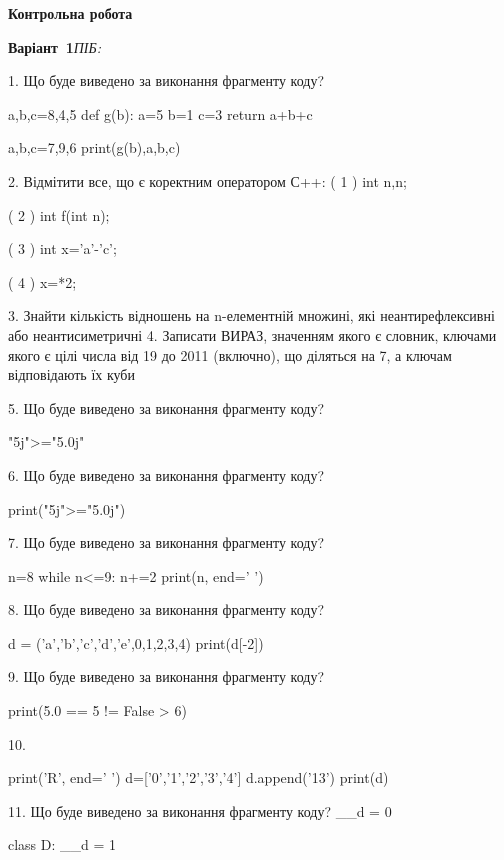 \documentclass[11pt]{article}
\begin{document}
{\large\textbf{Контрольна робота}}

\textbf{Варіант \No\,1}\hfill \textit{ПІБ:}\,\underline{\hspace{60mm}}
\vspace{4mm}

1. Що буде виведено за виконання фрагменту коду?

a,b,c=8,4,5
def g(b):
    a=5
    b=1
    c=3
    return a+b+c

a,b,c=7,9,6
print(g(b),a,b,c)

2. %
Відмітити все, що є коректним оператором С++:
( 1 ) int n,n;

( 2 ) int f(int n);

( 3 ) int x='a'-'c';

( 4 ) x=*2;

3. 
Знайти кількість відношень на n-елементній множині, які неантирефлексивні або неантисиметричні
4. 
Записати ВИРАЗ, значенням якого є словник, ключами якого є цілі числа від 19 до 2011 (включно), що діляться на 7, а ключам відповідають їх куби 

5. Що буде виведено за виконання фрагменту коду?

"5j">="5.0j"

6. Що буде виведено за виконання фрагменту коду?

print("5j">="5.0j")

7. Що буде виведено за виконання фрагменту коду?

n=8
while n<=9:
    n+=2
print(n, end=' ')


8. Що буде виведено за виконання фрагменту коду?

d = ('a','b','c','d','e',0,1,2,3,4)
print(d[-2])


9. Що буде виведено за виконання фрагменту коду?

print(5.0 == 5 != False > 6)

10. 

print('R', end=' ')
d=['0','1','2','3','4']
d.append('13')
print(d)


11. Що буде виведено за виконання фрагменту коду?
__d = 0

class D:
    __d = 1
    
\end{document}
